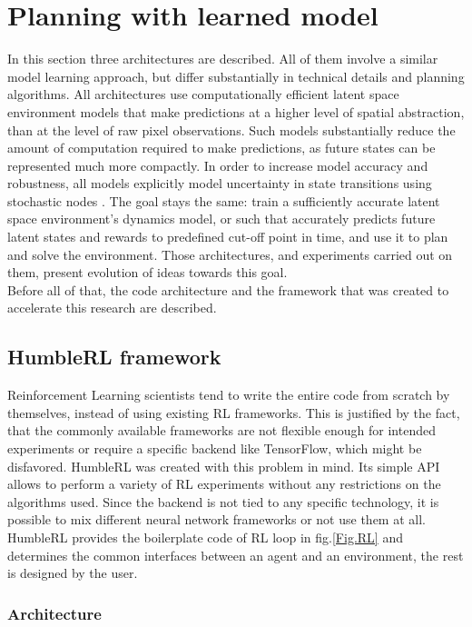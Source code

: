 \section{Planning with learned model}

In this section three architectures are described. All of them involve a similar model learning approach, but differ substantially in technical details and planning algorithms. All architectures use computationally efficient latent space environment models that make predictions at a higher level of spatial abstraction, than at the level of raw pixel observations. Such models substantially reduce the amount of computation required to make predictions, as future states can be represented much more compactly. In order to increase model accuracy and robustness, all models explicitly model uncertainty in state transitions using stochastic nodes \cite{Algo.FastGenerativeModels}.
The goal stays the same: train a sufficiently accurate latent space environment's dynamics model, or such that accurately predicts future latent states and rewards to predefined cut-off point in time, and use it to plan and solve the environment. Those architectures, and experiments carried out on them, present evolution of ideas towards this goal. \\
Before all of that, the code architecture and the framework that was created to accelerate this research are described.

\subsection{HumbleRL framework}

Reinforcement Learning scientists tend to write the entire code from scratch by themselves, instead of using existing RL frameworks. This is justified by the fact, that the commonly available frameworks are not flexible enough for intended experiments or require a specific backend like TensorFlow, which might be disfavored.
HumbleRL \cite{Code.HRL} was created with this problem in mind. Its simple API allows to perform a variety of RL experiments without any restrictions on the algorithms used. Since the backend is not tied to any specific technology, it is possible to mix different neural network frameworks or not use them at all. HumbleRL provides the boilerplate code of RL loop in fig.\ref{Fig.RL} and determines the common interfaces between an agent and an environment, the rest is designed by the user.

\subsubsection{Architecture}

